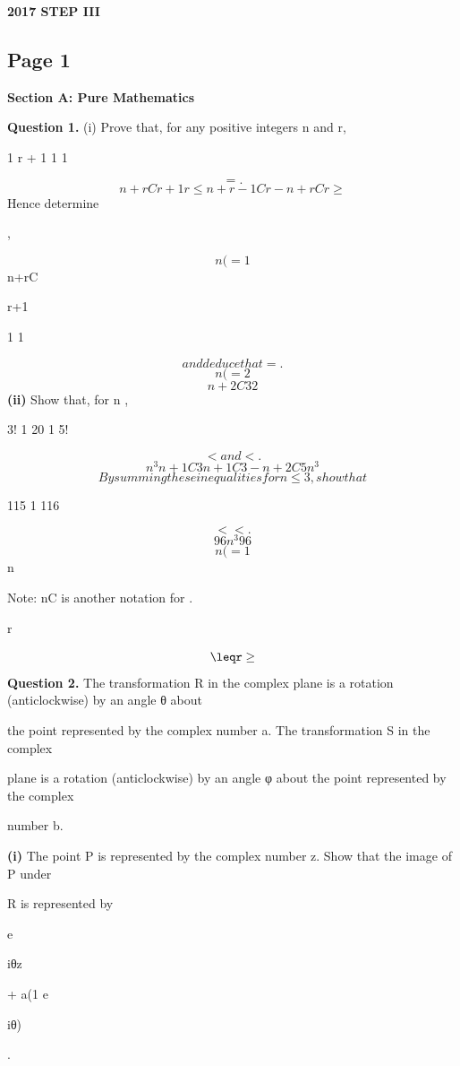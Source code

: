 \documentclass[12pt]{article}
\begin{document}
\begin{center}
{\Large \textbf{2017 STEP III}}
\end{center}

\subsection*{Page 1}
\begin{flushleft}
\bigskip\textbf{Section A: Pure Mathematics}\par
\bigskip\textbf{Question 1.} (i) Prove that, for any positive integers n and r,\par
1 r + 1 1 1\par
\[= .\]
\[n+rC r+1 r \leq n+r-1C r - n+rC r \geq\]
Hence determine\par
\infty\par
,\par
\[n(=1\]
n+rC\par
r+1\par
\infty\par
1 1\par
\[and deduce that = .\]
\[n(=2\]
\[n+2C3 2\]
\textbf{(ii)} Show that, for n  ,\par
3! 1 20 1 5!\par
\[< and < .\]
\[n^3 n+1C3 n+1C3 - n+2C5 n^3\]
\[By summing these inequalities for n \leq 3 , show that\]
\infty\par
115 1 116\par
\[< < .\]
\[96 n^3 96\]
\[n(=1\]
n\par
Note: nC is another notation for .\par
r\par
\[\leqr\geq\]
\bigskip\textbf{Question 2.} The transformation R in the complex plane is a rotation (anticlockwise) by an angle θ about\par
the point represented by the complex number a. The transformation S in the complex\par
plane is a rotation (anticlockwise) by an angle φ about the point represented by the complex\par
number b.\par
\textbf{(i)} The point P is represented by the complex number z. Show that the image of P under\par
R is represented by\par
e\par
iθz\par
+ a(1 e\par
iθ)\par
.\par

\end{flushleft}
\end{document}
